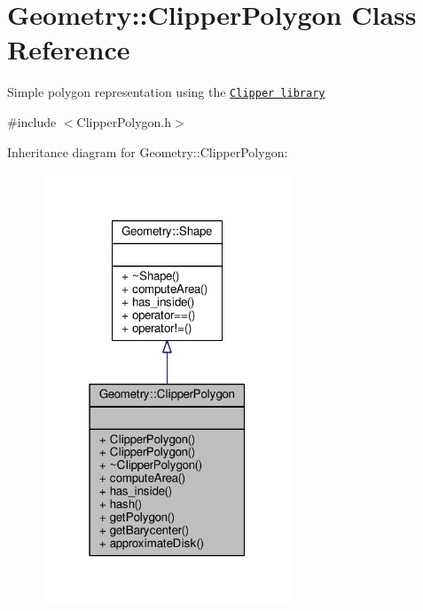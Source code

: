 \hypertarget{classGeometry_1_1ClipperPolygon}{}\section{Geometry\+:\+:Clipper\+Polygon Class Reference}
\label{classGeometry_1_1ClipperPolygon}


Simple polygon representation using the \href{http://www.angusj.com/delphi/clipper.php}{\tt Clipper library}  




{\ttfamily \#include $<$Clipper\+Polygon.\+h$>$}



Inheritance diagram for Geometry\+:\+:Clipper\+Polygon\+:\nopagebreak
\begin{figure}[H]
\begin{center}
\leavevmode
\includegraphics[width=211pt]{classGeometry_1_1ClipperPolygon__inherit__graph}
\end{center}
\end{figure}


